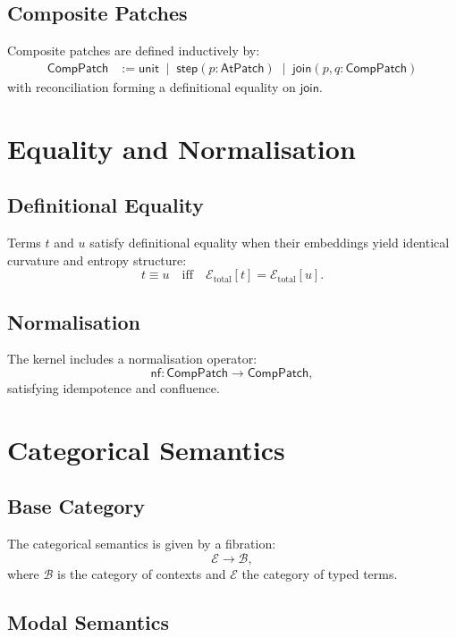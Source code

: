 \subsection{Composite Patches}

Composite patches are defined inductively by:
\begin{align*}
\mathsf{CompPatch} &:=
  \mathsf{unit}
  \;\mid\;
  \mathsf{step}(p : \mathsf{AtPatch})
  \;\mid\;
  \mathsf{join}(p,q : \mathsf{CompPatch})
\end{align*}
with reconciliation forming a definitional equality on $\mathsf{join}$.

\section{Equality and Normalisation}

\subsection{Definitional Equality}

Terms $t$ and $u$ satisfy definitional equality when their embeddings yield identical curvature and entropy structure:
\[
t \equiv u \quad \text{iff} \quad
\mathcal{E}_{\mathrm{total}}[t] = \mathcal{E}_{\mathrm{total}}[u].
\]

\subsection{Normalisation}

The kernel includes a normalisation operator:
\[
\mathsf{nf} : \mathsf{CompPatch} \to \mathsf{CompPatch},
\]
satisfying idempotence and confluence.

\section{Categorical Semantics}

\subsection{Base Category}

The categorical semantics is given by a fibration:
\[
\mathcal{E} \to \mathcal{B},
\]
where $\mathcal{B}$ is the category of contexts and $\mathcal{E}$ the category of typed terms.

\subsection{Modal Semantics}

